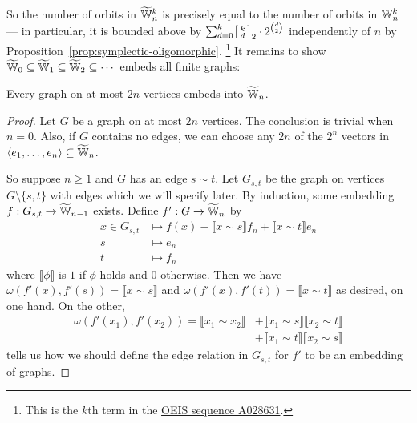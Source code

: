 So the number of orbits in $\widetilde {\mathbb{W}}_n^k$ is precisely equal to the number of orbits in $\mathbb{W}_n^k$
--- in particular, it is bounded above by $\sum_{d=0}^k \begin{bsmallmatrix}k \\ d\end{bsmallmatrix}_2 \cdot 2^{\binom{d}{2}}$ independently of $n$ by Proposition~\ref{prop:symplectic-oligomorphic}.%
\footnote{This is the $k$th term in the \href{https://oeis.org/A028361}{OEIS sequence A028631}.}
It remains to show $\widetilde {\mathbb{W}}_0 \subseteq \widetilde {\mathbb{W}}_1 \subseteq \widetilde {\mathbb{W}}_2 \subseteq \cdots$ embeds all finite graphs:

\begin{proposition}[{\cite[Theorem~8.11.2]{GR01}}]
    Every graph on at most $2n$ vertices embeds into $\widetilde {\mathbb{W}}_n$.
\end{proposition}
\begin{proof}
    Let $G$ be a graph on at most $2n$ vertices. 
    The conclusion is trivial when $n = 0$.
    Also, if $G$ contains no edges, we can choose any $2n$ of the $2^n$ vectors in 
    $\langle e_1, \ldots, e_n \rangle \subseteq \widetilde {\mathbb{W}}_n$.
    
    So suppose $n \geq 1$ and $G$ has an edge $s \sim t$.
    Let $G_{s,t}$ be the graph on vertices $G \setminus \{s, t\}$ with edges which we will specify later.
    By induction, some embedding $f : G_{s, t} \to \widetilde {\mathbb{W}}_{n-1}$ exists.
    Define $f' : G \to \widetilde {\mathbb{W}}_n$ by
    \begin{align*}
        x \in G_{s, t} &\mapsto f(x) - \llbracket x \sim s \rrbracket f_n + \llbracket x \sim t \rrbracket e_n \\
        s &\mapsto e_n \\
        t &\mapsto f_n
    \end{align*}
    where $\llbracket \phi \rrbracket$ is $1$ if $\phi$ holds and $0$ otherwise.
    Then we have $\omega(f'(x), f'(s)) = \llbracket x \sim s \rrbracket$ 
    and $\omega(f'(x), f'(t)) = \llbracket x \sim t \rrbracket$ as desired, on one hand.
    On the other,
    \begin{align*}
        \omega( f'(x_1), f'(x_2) ) 
        = \llbracket x_1 \sim x_2 \rrbracket 
        &+ \llbracket x_1 \sim s \rrbracket \llbracket x_2 \sim t \rrbracket \\
        &+ \llbracket x_1 \sim t \rrbracket \llbracket x_2 \sim s \rrbracket
    \end{align*}
    tells us how we should define the edge relation in $G_{s,t}$ for $f'$ to be an embedding of graphs.
\end{proof}

